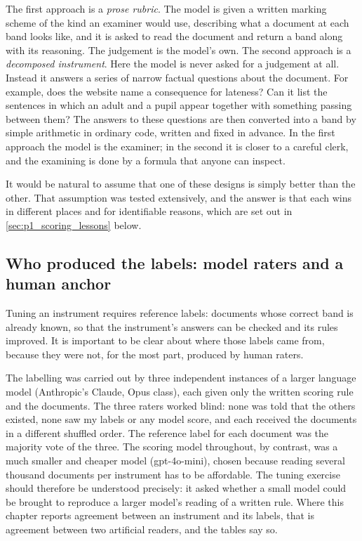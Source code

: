 The first approach is a \textit{prose rubric}. The model is given a written
marking scheme of the kind an examiner would use, describing what a document
at each band looks like, and it is asked to read the document and return a
band along with its reasoning. The judgement is the model's own. The second
approach is a \textit{decomposed instrument}. Here the model is never asked
for a judgement at all. Instead it answers a series of narrow factual
questions about the document. For example, does the website name a
consequence for lateness? Can it list the sentences in which an adult and a
pupil appear together with something passing between them? The answers to
these questions are then converted into a band by simple arithmetic in
ordinary code, written and fixed in advance. In the first approach the model
is the examiner; in the second it is closer to a careful clerk, and the
examining is done by a formula that anyone can inspect.

It would be natural to assume that one of these designs is simply better
than the other. That assumption was tested extensively, and the answer is
that each wins in different places and for identifiable reasons, which are
set out in \cref{sec:p1_scoring_lessons} below.

\subsection{Who produced the labels: model raters and a human anchor}
\label{sec:p1_scoring_raters}

Tuning an instrument requires reference labels: documents whose correct band
is already known, so that the instrument's answers can be checked and its
rules improved. It is important to be clear about where those labels came
from, because they were not, for the most part, produced by human raters.

The labelling was carried out by three independent instances of a larger
language model (Anthropic's Claude, Opus class), each given only the written
scoring rule and the documents. The three raters worked blind: none was told
that the others existed, none saw my labels or any model score, and each
received the documents in a different shuffled order. The reference label
for each document was the majority vote of the three. The scoring model
throughout, by contrast, was a much smaller and cheaper model (gpt-4o-mini),
chosen because reading several thousand documents per instrument has to be
affordable. The tuning exercise should therefore be understood precisely:
it asked whether a small model could be brought to reproduce a larger
model's reading of a written rule. Where this chapter reports agreement
between an instrument and its labels, that is agreement between two
artificial readers, and the tables say so.

